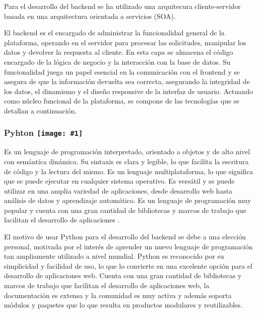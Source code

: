 Para el desarrollo del backend se ha utilizado una arquitecura cliente-servidor basada en una arquitectura orientada a servicios (SOA).\newline

El backend es el encargado de administrar la funcionalidad general de la plataforma, operando en el servidor para procesar las solicitudes, manipular los datos y devolver la respuesta al cliente. En esta capa se almacena el código encargado de la lógica de negocio y la interacción con la base de datos. Su funcionalidad juega un papel esencial en la comunicación con el frontend y se asegura de que la información devuelta sea correcta, asegurando la integridad de los datos, el dinamismo y el diseño responsive de la interfaz de usuario. Actuando como núcleo funcional de la plataforma, se compone de las tecnologías que se detallan a continuación.

\renewcommand{\icon}[1]{\texttt{[image: \#1]}}
\subsubsection*{Pyhton \protect\icon{./imagenes/python_logo.png}}
Es un lenguaje de programación interpretado, orientado a objetos y de alto nivel con semántica dinámica. Su sintaxis es clara y legible, lo que facilita la escritura de código y la lectura del mismo. Es un lenguaje multiplataforma, lo que significa que se puede ejecutar en cualquier sistema operativo. Es versátil y se puede utilizar en una amplia variedad de aplicaciones, desde desarrollo web hasta análisis de datos y aprendizaje automático. Es un lenguaje de programación muy popular y cuenta con una gran cantidad de bibliotecas y marcos de trabajo que facilitan el desarrollo de aplicaciones \cite{python2021python}.\newline

El motivo de usar Python para el desarrollo del backend se debe a una elección personal, motivada por el interés de aprender un nuevo lenguaje de programación tan ampliamente utilizado a nivel mundial. Python es reconocido por su simplicidad y facilidad de uso, lo que lo convierte en una excelente opción para el desarrollo de aplicaciones web. Cuenta con una gran cantidad de bibliotecas y marcos de trabajo que facilitan el desarrollo de aplicaciones web, la documentación es extensa y la comunidad es muy activa y además soporta módulos y paquetes que lo que resulta en productos modulares y reutilizables.

\renewcommand{\icon}[1]{\texttt{[image: \#1]}}
